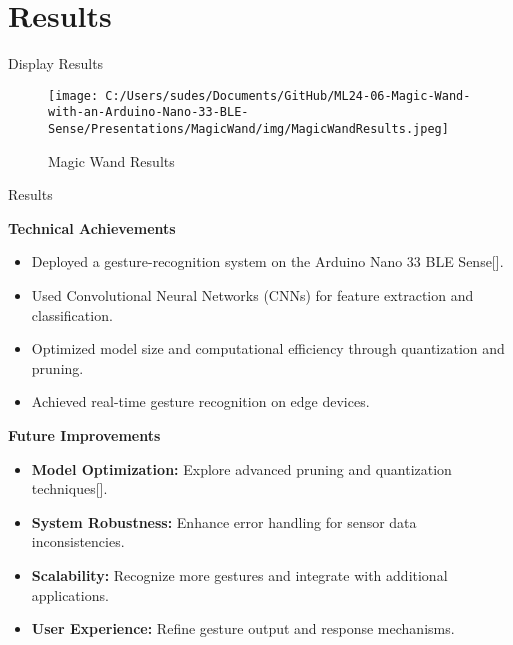 %
%
%
\section{Results}
\begin{frame}{Display Results}
	\begin{figure}[h]
		\centering
		\texttt{[image: C:/Users/sudes/Documents/GitHub/ML24-06-Magic-Wand-with-an-Arduino-Nano-33-BLE-Sense/Presentations/MagicWand/img/MagicWandResults.jpeg]}
		\caption{Magic Wand Results}
		\label{fig:magicwand_results}
	\end{figure}
	
\end{frame}


\begin{frame}{Results}

\textbf{Technical Achievements}
	\begin{itemize}
		\item Deployed a gesture-recognition system on the Arduino Nano 33 BLE Sense[\cite{Arduino:2015}].
		\item Used Convolutional Neural Networks (CNNs) for feature extraction and classification.
		\item Optimized model size and computational efficiency through quantization and pruning.
		\item Achieved real-time gesture recognition on edge devices.
	\end{itemize}



\textbf{Future Improvements}
	\begin{itemize}
		\item \textbf{Model Optimization:} Explore advanced pruning and quantization techniques[\cite{Shi:2016}].
		\item \textbf{System Robustness:} Enhance error handling for sensor data inconsistencies.
		\item \textbf{Scalability:} Recognize more gestures and integrate with additional applications.
		\item \textbf{User Experience:} Refine gesture output and response mechanisms.
	\end{itemize}
\end{frame}
